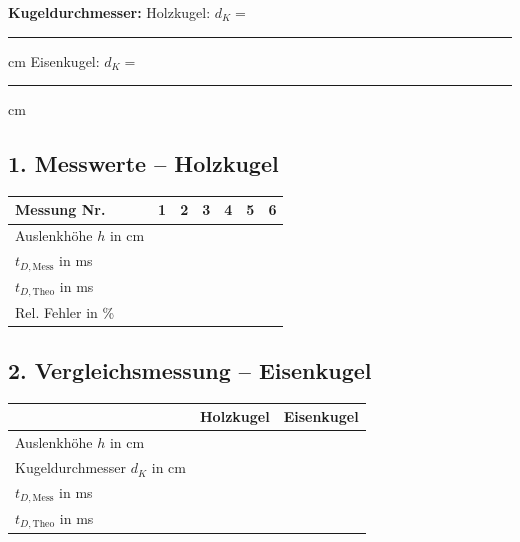 \documentclass[11pt,a4paper]{scrartcl}
\begin{document}
	\textbf{Kugeldurchmesser:} \quad Holzkugel: $d_K = $ \rule{2cm}{0.4pt} cm \hfill Eisenkugel: $d_K = $ \rule{2cm}{0.4pt} cm
	
	\vspace{0.3cm}
	
	\subsection*{1. Messwerte -- Holzkugel}
	
	\begin{center}
		\renewcommand{\arraystretch}{2.5}
		\begin{tabular}{|p{4cm}|p{1.5cm}|p{1.5cm}|p{1.5cm}|p{1.5cm}|p{1.5cm}|p{1.5cm}|}
			\hline
			\textbf{Messung Nr.} & \centering\textbf{1} & \centering\textbf{2} & \centering\textbf{3} & \centering\textbf{4} & \centering\textbf{5} & \centering\arraybackslash\textbf{6} \\
			\hline
			Auslenkhöhe $h$ in cm & & & & & & \\
			\hline
			$t_{D,\text{Mess}}$ in ms & & & & & & \\
			\hline
			$t_{D,\text{Theo}}$ in ms & & & & & & \\
			\hline
			Rel. Fehler in \% & & & & & & \\
			\hline
		\end{tabular}
	\end{center}
	
	\vspace{0.5cm}
	
	\subsection*{2. Vergleichsmessung -- Eisenkugel}
	
	\begin{center}
		\renewcommand{\arraystretch}{2.5}
		\begin{tabular}{|p{5cm}|p{4cm}|p{4cm}|}
			\hline
			& \centering\textbf{Holzkugel} & \centering\arraybackslash\textbf{Eisenkugel} \\
			\hline
			Auslenkhöhe $h$ in cm & & \\
			\hline
			Kugeldurchmesser $d_K$ in cm & & \\
			\hline
			$t_{D,\text{Mess}}$ in ms & & \\
			\hline
			$t_{D,\text{Theo}}$ in ms & & \\
			\hline
		\end{tabular}
	\end{center}
	
\end{document}
